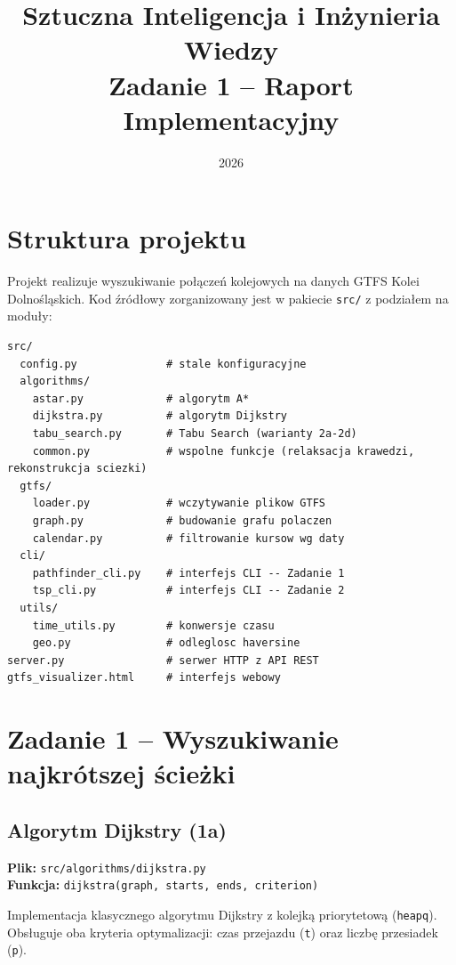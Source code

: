\documentclass[12pt,a4paper]{article}
\title{\textbf{Sztuczna Inteligencja i Inżynieria Wiedzy}\\
\large Zadanie 1 -- Raport Implementacyjny}
\author{}
\date{2026}
\begin{document}
\maketitle
\tableofcontents
\newpage

\section{Struktura projektu}

Projekt realizuje wyszukiwanie połączeń kolejowych na danych GTFS Kolei Dolnośląskich.
Kod źródłowy zorganizowany jest w pakiecie \texttt{src/} z podziałem na moduły:

\begin{lstlisting}
src/
  config.py              # stale konfiguracyjne
  algorithms/
    astar.py             # algorytm A*
    dijkstra.py          # algorytm Dijkstry
    tabu_search.py       # Tabu Search (warianty 2a-2d)
    common.py            # wspolne funkcje (relaksacja krawedzi, rekonstrukcja sciezki)
  gtfs/
    loader.py            # wczytywanie plikow GTFS
    graph.py             # budowanie grafu polaczen
    calendar.py          # filtrowanie kursow wg daty
  cli/
    pathfinder_cli.py    # interfejs CLI -- Zadanie 1
    tsp_cli.py           # interfejs CLI -- Zadanie 2
  utils/
    time_utils.py        # konwersje czasu
    geo.py               # odleglosc haversine
server.py                # serwer HTTP z API REST
gtfs_visualizer.html     # interfejs webowy
\end{lstlisting}

\section{Zadanie 1 -- Wyszukiwanie najkrótszej ścieżki}

\subsection{Algorytm Dijkstry (1a)}

\textbf{Plik:} \texttt{src/algorithms/dijkstra.py}\\
\textbf{Funkcja:} \texttt{dijkstra(graph, starts, ends, criterion)}

Implementacja klasycznego algorytmu Dijkstry z kolejką priorytetową (\texttt{heapq}).
Obsługuje oba kryteria optymalizacji: czas przejazdu (\texttt{t}) oraz liczbę przesiadek
(\texttt{p}).
\end{document}
